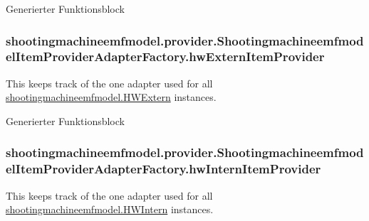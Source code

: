 Generierter Funktionsblock \hypertarget{classshootingmachineemfmodel_1_1provider_1_1_shootingmachineemfmodel_item_provider_adapter_factory_a043dd5416233a000b0059b95bc8c6239}{
\subsubsection[{hw\-Extern\-Item\-Provider}]{ shootingmachineemfmodel.\-provider.\-Shootingmachineemfmodel\-Item\-Provider\-Adapter\-Factory.\-hw\-Extern\-Item\-Provider\hspace{0.3cm}{\ttfamily [protected]}}}\label{classshootingmachineemfmodel_1_1provider_1_1_shootingmachineemfmodel_item_provider_adapter_factory_a043dd5416233a000b0059b95bc8c6239}
This keeps track of the one adapter used for all \hyperlink{interfaceshootingmachineemfmodel_1_1_h_w_extern}{shootingmachineemfmodel.\-H\-W\-Extern} instances.

Generierter Funktionsblock \hypertarget{classshootingmachineemfmodel_1_1provider_1_1_shootingmachineemfmodel_item_provider_adapter_factory_a1aa46d3bffc3396b540d7771314de73e}{
\subsubsection[{hw\-Intern\-Item\-Provider}]{ shootingmachineemfmodel.\-provider.\-Shootingmachineemfmodel\-Item\-Provider\-Adapter\-Factory.\-hw\-Intern\-Item\-Provider\hspace{0.3cm}{\ttfamily [protected]}}}\label{classshootingmachineemfmodel_1_1provider_1_1_shootingmachineemfmodel_item_provider_adapter_factory_a1aa46d3bffc3396b540d7771314de73e}
This keeps track of the one adapter used for all \hyperlink{interfaceshootingmachineemfmodel_1_1_h_w_intern}{shootingmachineemfmodel.\-H\-W\-Intern} instances.

